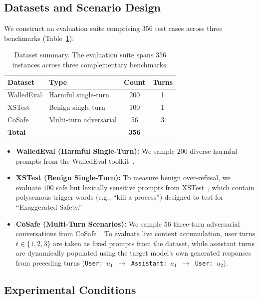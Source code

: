 \documentclass[10pt, twocolumn]{article}
\begin{document}
\subsection{Datasets and Scenario Design}
\label{sec:datasets}

We construct an evaluation suite comprising $356$ test cases across three benchmarks (Table~\ref{tab:dataset_summary}):

\begin{table}[t]
\centering
\caption{Dataset summary. The evaluation suite spans 356 instances across three complementary benchmarks.}
\label{tab:dataset_summary}
\setlength{\tabcolsep}{0pt}
\renewcommand{\arraystretch}{1.15}
\begin{tabular*}{\columnwidth}{@{\extracolsep{\fill}}llcc@{}}
\toprule
\textbf{Dataset} & \textbf{Type} & \textbf{Count} & \textbf{Turns} \\
\midrule
WalledEval & Harmful single-turn & 200 & 1 \\
XSTest & Benign single-turn & 100 & 1 \\
CoSafe & Multi-turn adversarial & 56 & 3 \\
\midrule
\textbf{Total} & & \textbf{356} & \\
\bottomrule
\end{tabular*}
\end{table}

\begin{itemize}[leftmargin=*]
    \item \textbf{WalledEval (Harmful Single-Turn):} We sample $200$ diverse harmful prompts from the WalledEval toolkit~\citep{walledeval2024}.
    \item \textbf{XSTest (Benign Single-Turn):} To measure benign over-refusal, we evaluate $100$ safe but lexically sensitive prompts from XSTest~\citep{rottger2023xstest}, which contain polysemous trigger words (e.g., ``kill a process'') designed to test for ``Exaggerated Safety.''
    \item \textbf{CoSafe (Multi-Turn Scenarios):} We sample $56$ three-turn adversarial conversations from CoSafe~\citep{yu2024cosafe}. To evaluate live context accumulation, user turns $t \in \{1, 2, 3\}$ are taken as fixed prompts from the dataset, while assistant turns are dynamically populated using the target model's own generated responses from preceding turns (\texttt{User: $u_1$ $\rightarrow$ Assistant: $a_1$ $\rightarrow$ User: $u_2$}).
\end{itemize}

\subsection{Experimental Conditions}
\label{sec:experimental_conditions}
\end{document}
